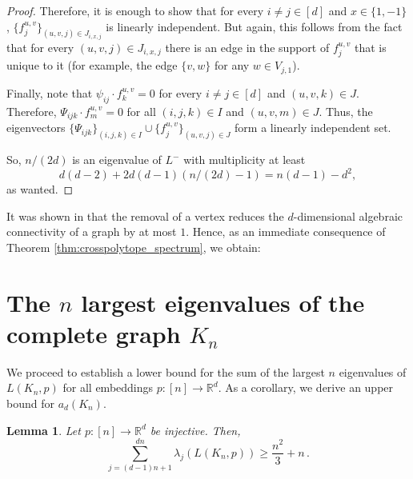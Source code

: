 \documentclass[a4paper,11pt]{article}
\theoremstyle{plain}
\newtheorem{lemma}[theorem]{\bf Lemma}
\theoremstyle{definition}
\newcommand{\Rea}{{\mathbb R}}
\begin{document}
\begin{proof}
Therefore, it is enough to show that for every $i\neq j\in[d]$ and $x\in\{1,-1\}$, $\{f_j^{u,v}\}_{(u,v,j)\in J_{i,x,j}}$ is linearly independent. But again, this follows from the fact that for every $(u,v,j)\in J_{i,x,j}$ there is an edge in the support of $f_{j}^{u,v}$ that is unique to it (for example, the edge $\{v,w\}$ for any $w\in V_{j,1}$).

Finally, note that $\psi_{ij}\cdot f_{k}^{u,v}=0$ for every $i\neq j\in[d]$ and $(u,v,k)\in J$. Therefore, $\Psi_{i j k}\cdot f_{m}^{u,v}=0$ for all $(i,j,k)\in I$ and $(u,v,m)\in J$. Thus, the eigenvectors $\{\Psi_{i j k}\}_{(i,j,k)\in I}\cup \{f_j^{u,v}\}_{(u,v,j)\in J}$ form a linearly independent set.

So, $n/(2d)$ is an eigenvalue of $L^{-}$ with multiplicity at least
\[
    d(d-2)+2d(d-1)(n/(2d)-1)= n(d-1)-d^2,
\]
as wanted.
\end{proof}


It was shown in \cite[Lemma 4.5]{jordan2020rigidity} that the removal of a vertex reduces the $d$-dimensional algebraic connectivity of a graph by at most $1$. Hence, as an immediate consequence of Theorem \ref{thm:crosspolytope_spectrum}, we obtain:

\lowerbound*



\section{The $n$ largest eigenvalues of the complete graph $K_n$}\label{sec:top-n-ev}

We proceed to establish a lower bound for the sum of the largest $n$ eigenvalues of $L(K_n,p)$ for all embeddings $p:[n]\to \Rea^d$. As a corollary, we  derive an upper bound for $a_d(K_n)$.

\begin{lemma}\label{lem:one_third}
Let $p:[n]\to\Rea^d$ be injective. Then,
\[
\sum_{j=(d-1)n+1}^{d n}\lambda_j(L(K_n,p)) \ge 
\frac {n^2}3+n\,.
\]
\end{lemma}
\end{document}
